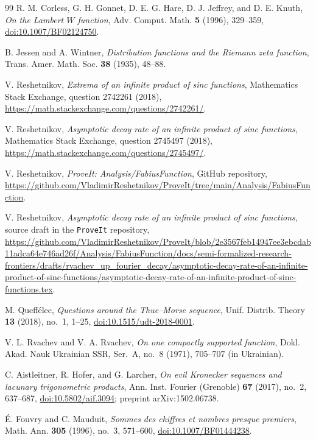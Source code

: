 \documentclass[11pt,oneside]{article}
\numberwithin{equation}{section}
\theoremstyle{definition}
\theoremstyle{remark}
\begin{document}
\begin{thebibliography}{99}
R. M. Corless, G. H. Gonnet, D. E. G. Hare, D. J. Jeffrey, and D. E. Knuth,
\emph{On the Lambert $W$ function},
Adv. Comput. Math. \textbf{5} (1996), 329--359,
\href{https://doi.org/10.1007/BF02124750}{doi:10.1007/BF02124750}.

B. Jessen and A. Wintner,
\emph{Distribution functions and the Riemann zeta function},
Trans. Amer. Math. Soc. \textbf{38} (1935), 48--88.

V. Reshetnikov,
\emph{Extrema of an infinite product of sinc functions},
Mathematics Stack Exchange, question 2742261 (2018),
\url{https://math.stackexchange.com/questions/2742261/}.

V. Reshetnikov,
\emph{Asymptotic decay rate of an infinite product of sinc functions},
Mathematics Stack Exchange, question 2745497 (2018),
\url{https://math.stackexchange.com/questions/2745497/}.

V. Reshetnikov,
\emph{ProveIt: Analysis/FabiusFunction}, GitHub repository,
\url{https://github.com/VladimirReshetnikov/ProveIt/tree/main/Analysis/FabiusFunction}.

V. Reshetnikov,
\emph{Asymptotic decay rate of an infinite product of sinc functions}, source draft in the
\texttt{ProveIt} repository,
\url{https://github.com/VladimirReshetnikov/ProveIt/blob/2e3567feb14947ee3ebcdab11adca64e746ad26f/Analysis/FabiusFunction/docs/semi-formalized-research-frontiers/drafts/rvachev_up_fourier_decay/asymptotic-decay-rate-of-an-infinite-product-of-sinc-functions/asymptotic-decay-rate-of-an-infinite-product-of-sinc-functions.tex}.

M. Queff\'elec,
\emph{Questions around the Thue--Morse sequence},
Unif. Distrib. Theory \textbf{13} (2018), no.~1, 1--25,
\href{https://doi.org/10.1515/udt-2018-0001}{doi:10.1515/udt-2018-0001}.

V. L. Rvachev and V. A. Rvachev,
\emph{On one compactly supported function},
Dokl. Akad. Nauk Ukrainian SSR, Ser.~A, no.~8 (1971), 705--707
(in Ukrainian).


C. Aistleitner, R. Hofer, and G. Larcher,
\emph{On evil Kronecker sequences and lacunary trigonometric products},
Ann. Inst. Fourier (Grenoble) \textbf{67} (2017), no.~2, 637--687,
\href{https://doi.org/10.5802/aif.3094}{doi:10.5802/aif.3094};
preprint arXiv:1502.06738.

\'E. Fouvry and C. Mauduit,
\emph{Sommes des chiffres et nombres presque premiers},
Math. Ann. \textbf{305} (1996), no.~3, 571--600,
\href{https://doi.org/10.1007/BF01444238}{doi:10.1007/BF01444238}.


\end{thebibliography}
\end{document}
